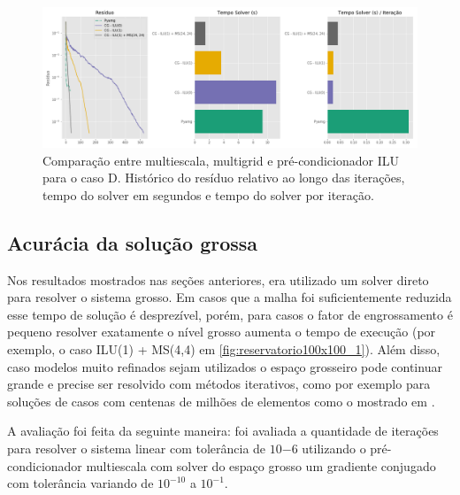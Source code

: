     
\begin{figure}[!htbp]
\caption{Comparação entre multiescala, multigrid e pré-condicionador ILU para o caso D. Histórico do resíduo relativo ao longo das iterações, tempo do solver em segundos e tempo do solver por iteração. }
\label{fig:casoE_2}
\centering
\includegraphics[width=\textwidth]{chap08/figs/casoE_2.png}
\end{figure}


\subsection{Acurácia da solução grossa}

Nos resultados mostrados nas seções anteriores, era utilizado um solver direto para resolver 
o sistema grosso. Em casos que a malha foi suficientemente reduzida esse tempo de solução é desprezível,
porém, para casos o fator de engrossamento é pequeno resolver exatamente o nível grosso aumenta
o tempo de execução (por exemplo, o caso ILU(1) + MS(4,4) em \ref{fig:reservatorio100x100_1}). 
Além disso, caso modelos muito refinados sejam utilizados o espaço grosseiro pode continuar
grande e precise ser resolvido com métodos iterativos, como por exemplo para soluções de casos
com centenas de milhões de elementos como o mostrado em \cite{geomecrio}.


A avaliação foi feita da seguinte maneira: foi avaliada a quantidade de iterações para resolver o sistema linear com tolerância de $10{-6}$ utilizando o pré-condicionador multiescala com solver do espaço grosso um gradiente conjugado com tolerância variando de $10^{-10}$  a $10^{-1}$. 